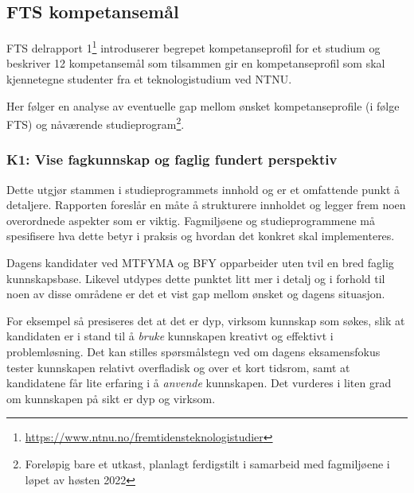 \subsection{FTS kompetansemål}
\label{sec:fts-competencies}
FTS delrapport 1\footnote{\url{https://www.ntnu.no/fremtidensteknologistudier}} introduserer begrepet kompetanseprofil for et studium og beskriver 12 kompetansemål som tilsammen gir en kompetanseprofil som skal kjennetegne studenter fra et teknologistudium ved NTNU.

Her følger en analyse av eventuelle gap mellom ønsket kompetanseprofile (i følge FTS) og nåværende studieprogram\footnote{Foreløpig bare et utkast, planlagt ferdigstilt i samarbeid med fagmiljøene i løpet av høsten 2022}.

\subsubsection{K1: Vise fagkunnskap og faglig fundert perspektiv}

Dette utgjør stammen i studieprogrammets innhold og er et omfattende punkt å detaljere. Rapporten foreslår en måte å strukturere innholdet og legger frem noen overordnede aspekter som er viktig. Fagmiljøene og studieprogrammene må spesifisere hva dette betyr i praksis og hvordan det konkret skal implementeres.

Dagens kandidater ved MTFYMA og BFY opparbeider uten tvil en bred faglig kunnskapsbase. Likevel utdypes dette punktet litt mer i detalj og i forhold til noen av disse områdene er det et vist gap mellom ønsket og dagens situasjon.

For eksempel så presiseres det at det er dyp, virksom kunnskap som søkes, slik at kandidaten er i stand til å \emph{bruke} kunnskapen kreativt og effektivt i problemløsning. Det kan stilles spørsmålstegn ved om dagens eksamensfokus tester kunnskapen relativt overfladisk og over et kort tidsrom, samt at kandidatene får lite erfaring i å \emph{anvende} kunnskapen. Det vurderes i liten grad om kunnskapen på sikt er dyp og virksom.

\begin{comment}
Delrapport 1 deler opp dette punktet i 4 deler

\begin{itemize}
	\item basiskunnskap
	\item breddekunnskap
	\item dybdekunnskap
	\item kompelementær kunnskap
\end{itemize}

generaliserbare konsepter.
kontekstualisering
beregningsorientering
stordata, maskinlæring
foretningsforståelse, invoasjonsprosesser

ii) bredde teknisk: prosjektledelse, muliggjørende teknologier

iii) vei dybde vs bredde

iv) komplementært i forhold til fremtidens behov

-bredde i kunnskapsprofiler

Steam - kreativitet
\end{comment}

